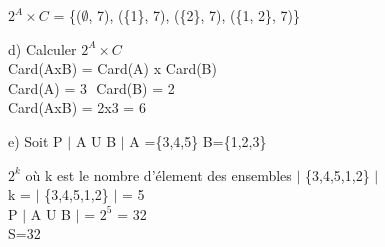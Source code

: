 $2^{A}×C$ = \{($\emptyset$, 7), (\{1\}, 7), (\{2\}, 7), (\{1, 2\}, 7)\} \\

\vspace{5mm} %

d) Calculer $2^{A}×C$ \\

Card(AxB) = Card(A) x Card(B) \\

Card(A) = 3 $ $ Card(B) = 2 \\

Card(AxB) = 2x3 = 6 \\

\newpage

e) Soit P $|$ A U B $|$ A =\{3,4,5\} B=\{1,2,3\}
\vspace{3mm} %

$2^{k}$ où k est le nombre d'élement des ensembles $|$ \{3,4,5,1,2\} $|$ \\

k = $|$ \{3,4,5,1,2\} $|$ = 5 \\

P $|$ A U B $|$ = $2^{5}$ = 32 \\

S=32 \\

\vspace{3mm} %
